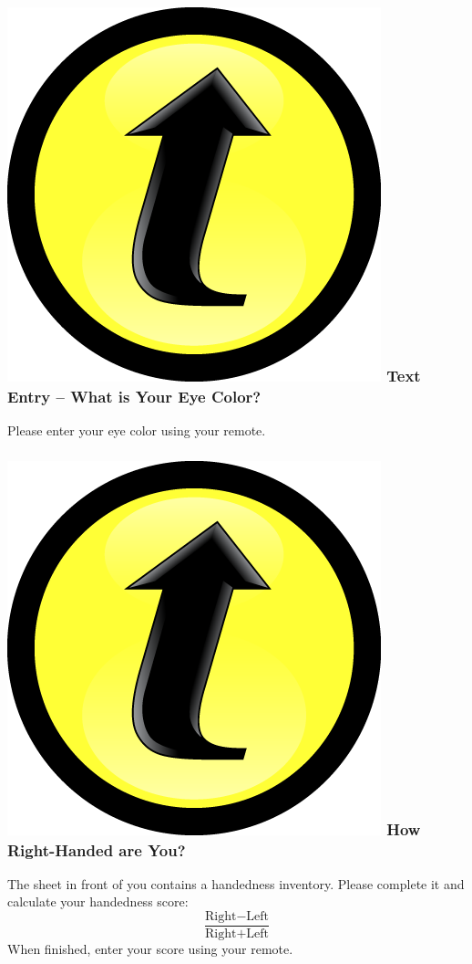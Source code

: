 \documentclass[handout]{beamer}
\begin{document}

\begin{frame}
\frametitle{\includegraphics[scale = 0.05]{./images/clicker} \hfill  Text Entry -- What is Your Eye Color?}

Please enter your eye color using your remote.

\end{frame}


\begin{frame}
\frametitle{\includegraphics[scale = 0.05]{./images/clicker} \hfill  How Right-Handed are You?}

The sheet in front of you contains a handedness inventory. Please complete it and calculate your handedness score:
	$$\frac{\mbox{Right} -\mbox{Left}}{\mbox{Right} + \mbox{Left}}$$
When finished, enter your score using your remote.
\end{frame}
\end{document}
